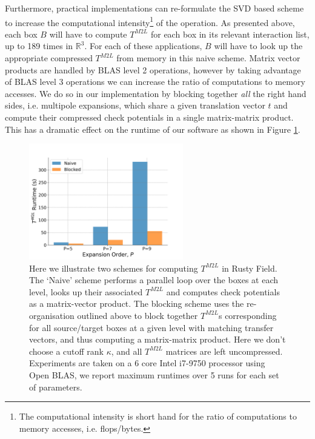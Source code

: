 Furthermore, practical implementations can re-formulate the SVD based scheme to increase the computational intensity\footnote{The computational intensity is short hand for the ratio of computations to memory accesses, i.e. flops/bytes.} of the operation. As presented above, each box $B$ will have to compute $T^{M2L}$ for each box in its relevant interaction list, up to 189 times in $\mathbb{R}^3$. For each of these applications, $B$ will have to look up the appropriate compressed $T^{M2L}$ from memory in this naive scheme. Matrix vector products are handled by BLAS level 2 operations, however by taking advantage of BLAS level 3 operations we can increase the ratio of computations to memory accesses. We do so in our implementation by blocking together \textit{all} the right hand sides, i.e. multipole expansions, which share a given translation vector $t$ and compute their compressed check potentials in a single matrix-matrix product. This has a dramatic effect on the runtime of our software as shown in Figure \ref{fig:chpt:3:sec:1:subsec:1:svd_m2l}.

\begin{figure}
    \centering
    \includegraphics[width=0.6\textwidth]{images/ch_3/svd_m2l.png}
    \caption{Here we illustrate two schemes for computing $T^{M2L}$ in Rusty Field. The `Naive' scheme performs a parallel loop over the boxes at each level, looks up their associated $T^{M2L}$ and computes check potentials as a matrix-vector product. The blocking scheme uses the re-organisation outlined above to block together $T^{M2L}$s corresponding for all source/target boxes at a given level with matching transfer vectors, and thus computing a matrix-matrix product. Here we don't choose a cutoff rank $\kappa$, and all $T^{M2L}$ matrices are left uncompressed. Experiments are taken on a 6 core Intel i7-9750 processor using Open BLAS, we report maximum runtimes over 5 runs
    for each set of parameters.}
    \label{fig:chpt:3:sec:1:subsec:1:svd_m2l}
\end{figure}


